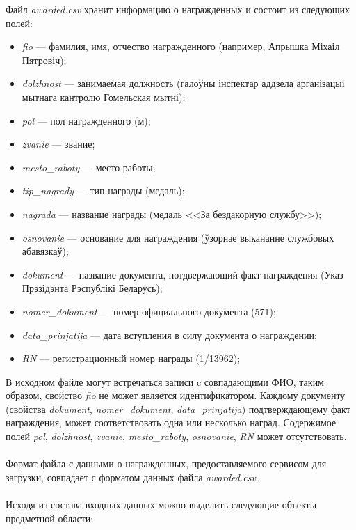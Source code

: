 Файл \textit{awarded.csv} хранит информацию о награжденных и состоит из следующих полей:
\begin{itemize}
\item
  \textit{fio} --- фамилия, имя, отчество награжденного
  (например, Апрышка Міхаіл Пятровіч);
\item
  \textit{dolzhnost} --- занимаемая должность
  (галоўны інспектар аддзела арганізацыі мытнага кантролю Гомельская мытні);
\item
  \textit{pol} --- пол награжденного (м);
\item
  \textit{zvanie} --- звание;
\item
  \textit{mesto\_raboty} --- место работы;
\item 
  \textit{tip\_nagrady} --- тип награды (медаль);
\item
  \textit{nagrada} --- название награды
  (медаль <<За бездакорную службу>>);
\item
  \textit{osnovanie} --- основание для награждения
  (ўзорнае выкананне службовых абавязкаў);
\item
  \textit{dokument} --- название документа, потдвержающий факт награждения
  (Указ Прэзідэнта Рэспублікі Беларусь);
\item
  \textit{nomer\_dokument} --- номер официального документа
  (571);
\item
  \textit{data\_prinjatija} --- дата вступления в силу документа о награждении;
\item
  \textit{RN} --- регистрационный номер награды (1/13962);
\end{itemize}

В исходном файле могут встречаться записи c совпадающими ФИО,
таким образом, свойство \textit{fio} не может является идентификатором.
Каждому документу (свойства \textit{dokument}, \textit{nomer\_dokument},
\textit{data\_prinjatija})
подтверждающему факт награждения, может соответствовать одна или
несколько наград.
Содержимое полей \textit{pol}, \textit{dolzhnost}, \textit{zvanie}, 
\textit{mesto\_raboty}, \textit{osnovanie}, \textit{RN} может отсутствовать.

\paragraph{}
Формат файла с данными о награжденных, предоставляемого сервисом для загрузки,
совпадает с форматом данных файла \textit{awarded.csv}.

\paragraph{}
Исходя из состава входных данных
можно выделить следующие объекты предметной области:

